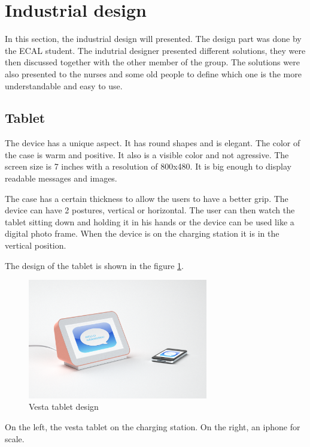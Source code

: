\section{Industrial design}

In this section, the industrial design will presented. The design part was done by the ECAL student. The indutrial designer presented different solutions, they were then discussed together with the other member of the group. The solutions were also presented to the nurses and some old people to define which one is the more understandable and easy to use.

\subsection{Tablet}
The device has a unique aspect. It has round shapes and is elegant.
The color of the case is warm and positive. It also is a visible color and not agressive. The screen size is 7 inches with a resolution of 800x480. It is big enough to display readable messages and images.

The case has a certain thickness to allow the users to have a better grip. The device can have 2 postures, vertical or horizontal. The user can then watch the tablet sitting down and holding it in his hands or the device can be used like a digital photo frame.
When the device is on the charging station it is in the vertical position.



The design of the tablet is shown in the figure \ref{fig:vesta design}.

\begin{figure}[!htb]
    \centering
    \includegraphics[width=0.7\textwidth,keepaspectratio]{chap/designFig/VestaRender4.png}
    \caption{Vesta tablet design}
    \label{fig:vesta design}
\end{figure}

On the left, the vesta tablet on the charging station. On the right, an iphone for scale.

